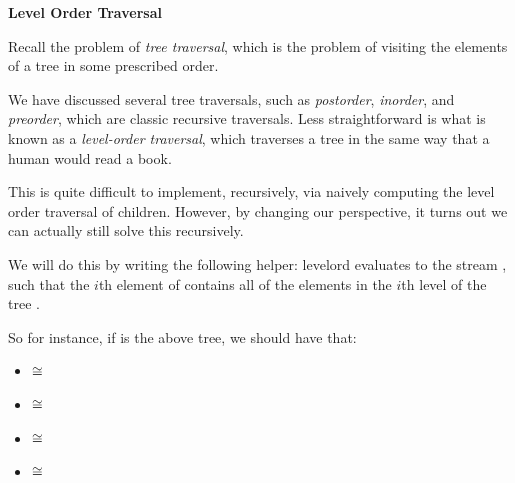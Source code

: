 \documentclass[addpoints,12pt]{exam}
\begin{document}
\begin{questions}
\newpage
{}

\textbf{Level Order Traversal}

Recall the problem of \textit{tree traversal}, which is the problem of visiting
the elements of a tree in some prescribed order.

We have discussed several tree traversals, such as \textit{postorder},
\textit{inorder}, and \textit{preorder}, which are classic recursive traversals.
Less straightforward is what is known as a \textit{level-order traversal}, which
traverses a tree in the same way that a human would read a book.

\begin{center}
\end{center}

This is quite difficult to implement, recursively, via naively computing
the level order traversal of children. However, by changing our perspective,
it turns out we can actually still solve this recursively.

We will do this by writing the following helper:
\spec
  {levelord}
  {}
  {}
  { evaluates to the stream , such that the
  $i$th element of  contains all of the elements in the $i$th
  level of the tree .}

So for instance, if  is the above tree, we should have that:
\begin{itemize}
  \item {} $\cong$ 
  \item {} $\cong$ 
  \item {} $\cong$ 
  \item {} $\cong$ 
\end{itemize}


\end{questions}
\end{document}
